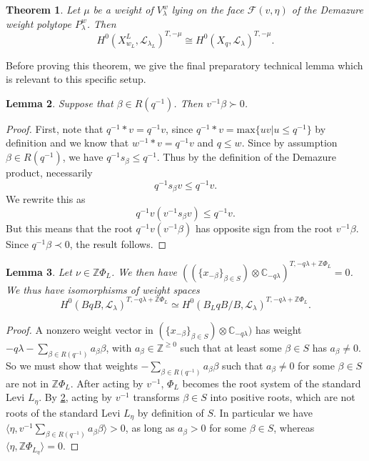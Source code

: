 \documentclass[12pt,reqno]{amsart}
\newtheorem{theorem}{Theorem}[section]
\newtheorem{lemma}[theorem]{Lemma}
\theoremstyle{definition}
\begin{document}
 \begin{theorem} \label{RothFinale}
 Let $\mu $ be a weight of $V^w_\lambda$ lying on the face $\mathcal{F}(v,\eta)$ of the Demazure weight polytope $P^w_\lambda$. Then 
 $$
 H^0(X^L_{w_L}, \mathscr{L}_{\lambda_L})^{T, -\mu} \cong H^0(X_q, \mathscr{L}_\lambda)^{T, -\mu}.
 $$
 \end{theorem}
 
 Before proving this theorem, we give the final preparatory technical lemma which is relevant to this specific setup. 
 
 
 
 \begin{lemma}\label{inversionsets}
Suppose that $\beta \in R(q^{-1})$. Then $v^{-1}\beta \succ 0$.
\end{lemma}

\begin{proof}
First, note that $q^{-1} \ast v = q^{-1}v$, since $q^{-1} \ast v = \mathrm{max}\{uv | u \leq q^{-1}\}$ by definition and we know that $w^{-1} \ast v = q^{-1} v$ and $q \leq w$. Since by assumption $\beta \in R(q^{-1})$, we have $q^{-1}s_\beta \le q^{-1}$. Thus by the definition of the Demazure product, necessarily $$q^{-1}s_\beta v \le q^{-1}v.$$  
We rewrite this as
$$
q^{-1}v(v^{-1}s_\beta v) \le q^{-1}v.
$$
But this means that the root $q^{-1}v \left(v^{-1}\beta \right)$ has opposite sign from the root $v^{-1}\beta$. Since $q^{-1}\beta \prec 0$, the result follows.
\end{proof}

\begin{lemma} \label{VanishLemma}
Let $\nu \in \mathbb{Z} \Phi_L$. We then have $((\{x_{-\beta}\}_{\beta \in S}) \otimes \mathbb{C}_{-q \lambda})^{T, -q \lambda + \mathbb{Z} \Phi_L}=0$. We thus have isomorphisms of weight spaces \[H^0(BqB, \mathscr{L}_{\lambda})^{T, -q \lambda + \mathbb{Z}\Phi_L} \simeq H^0(B_LqB/B, \mathscr{L}_{\lambda})^{T, -q \lambda+ \mathbb{Z} \Phi_L}.\]
\end{lemma}

\begin{proof}
A nonzero weight vector in $(\{x_{-\beta}\}_{\beta \in S}) \otimes \mathbb{C}_{-q \lambda})$ has weight $-q \lambda- \sum_{\beta \in R(q^{-1})} a_{\beta} \beta$, with $a_{\beta} \in \mathbb{Z}^{\geq 0}$ such that at least some $\beta \in S$ has $a_{\beta} \neq 0$. So we must show that weights $-\sum_{\beta \in R(q^{-1})} a_{\beta} \beta$ such that $a_{\beta} \neq 0$ for some $\beta \in S$ are not in $\mathbb{Z}\Phi_L$. After acting by $v^{-1}$, $\Phi_L$ becomes the root system of the standard Levi $L_{\eta}$. By \ref{inversionsets}, acting by $v^{-1}$ transforms $\beta \in S$ into positive roots, which are not roots of the standard Levi $L_{\eta}$ by definition of $S$. In particular we have $\langle \eta, v^{-1} \sum_{\beta \in R(q^{-1})} a_{\beta} \beta \rangle >0$, as long as $a_\beta >0$ for some $\beta \in S$, whereas $\langle \eta, \mathbb{Z}\Phi_{L_{\eta}} \rangle =0$. 
\end{proof}
\end{document}
